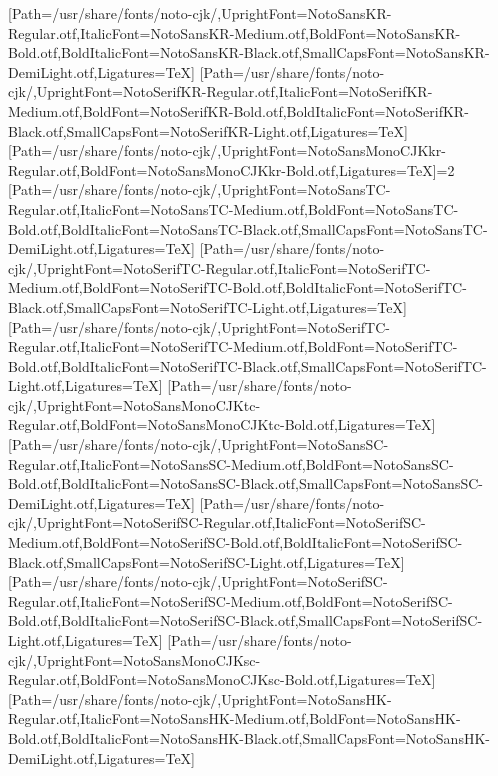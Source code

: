 \newfontfamily{}[Path=/usr/share/fonts/noto-cjk/,UprightFont=NotoSansKR-Regular.otf,ItalicFont=NotoSansKR-Medium.otf,BoldFont=NotoSansKR-Bold.otf,BoldItalicFont=NotoSansKR-Black.otf,SmallCapsFont=NotoSansKR-DemiLight.otf,Ligatures=TeX]
\newfontfamily{}[Path=/usr/share/fonts/noto-cjk/,UprightFont=NotoSerifKR-Regular.otf,ItalicFont=NotoSerifKR-Medium.otf,BoldFont=NotoSerifKR-Bold.otf,BoldItalicFont=NotoSerifKR-Black.otf,SmallCapsFont=NotoSerifKR-Light.otf,Ligatures=TeX]
\newfontfamily{}[Path=/usr/share/fonts/noto-cjk/,UprightFont=NotoSansMonoCJKkr-Regular.otf,BoldFont=NotoSansMonoCJKkr-Bold.otf,Ligatures=TeX]\else\ifnum\value{NotoCJKFamily}=2
\newfontfamily{}[Path=/usr/share/fonts/noto-cjk/,UprightFont=NotoSansTC-Regular.otf,ItalicFont=NotoSansTC-Medium.otf,BoldFont=NotoSansTC-Bold.otf,BoldItalicFont=NotoSansTC-Black.otf,SmallCapsFont=NotoSansTC-DemiLight.otf,Ligatures=TeX]
\newfontfamily{}[Path=/usr/share/fonts/noto-cjk/,UprightFont=NotoSerifTC-Regular.otf,ItalicFont=NotoSerifTC-Medium.otf,BoldFont=NotoSerifTC-Bold.otf,BoldItalicFont=NotoSerifTC-Black.otf,SmallCapsFont=NotoSerifTC-Light.otf,Ligatures=TeX]
\newfontfamily{}[Path=/usr/share/fonts/noto-cjk/,UprightFont=NotoSerifTC-Regular.otf,ItalicFont=NotoSerifTC-Medium.otf,BoldFont=NotoSerifTC-Bold.otf,BoldItalicFont=NotoSerifTC-Black.otf,SmallCapsFont=NotoSerifTC-Light.otf,Ligatures=TeX]
\newfontfamily{}[Path=/usr/share/fonts/noto-cjk/,UprightFont=NotoSansMonoCJKtc-Regular.otf,BoldFont=NotoSansMonoCJKtc-Bold.otf,Ligatures=TeX]
\newfontfamily{}[Path=/usr/share/fonts/noto-cjk/,UprightFont=NotoSansSC-Regular.otf,ItalicFont=NotoSansSC-Medium.otf,BoldFont=NotoSansSC-Bold.otf,BoldItalicFont=NotoSansSC-Black.otf,SmallCapsFont=NotoSansSC-DemiLight.otf,Ligatures=TeX]
\newfontfamily{}[Path=/usr/share/fonts/noto-cjk/,UprightFont=NotoSerifSC-Regular.otf,ItalicFont=NotoSerifSC-Medium.otf,BoldFont=NotoSerifSC-Bold.otf,BoldItalicFont=NotoSerifSC-Black.otf,SmallCapsFont=NotoSerifSC-Light.otf,Ligatures=TeX]
\newfontfamily{}[Path=/usr/share/fonts/noto-cjk/,UprightFont=NotoSerifSC-Regular.otf,ItalicFont=NotoSerifSC-Medium.otf,BoldFont=NotoSerifSC-Bold.otf,BoldItalicFont=NotoSerifSC-Black.otf,SmallCapsFont=NotoSerifSC-Light.otf,Ligatures=TeX]
\newfontfamily{}[Path=/usr/share/fonts/noto-cjk/,UprightFont=NotoSansMonoCJKsc-Regular.otf,BoldFont=NotoSansMonoCJKsc-Bold.otf,Ligatures=TeX]
\newfontfamily{}[Path=/usr/share/fonts/noto-cjk/,UprightFont=NotoSansHK-Regular.otf,ItalicFont=NotoSansHK-Medium.otf,BoldFont=NotoSansHK-Bold.otf,BoldItalicFont=NotoSansHK-Black.otf,SmallCapsFont=NotoSansHK-DemiLight.otf,Ligatures=TeX]
